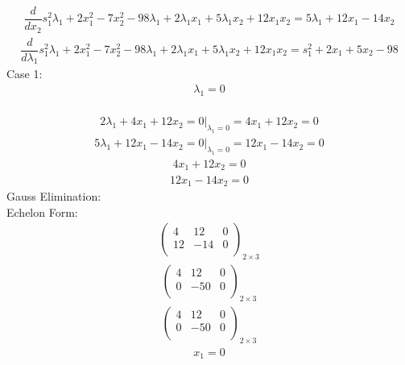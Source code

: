 \documentclass{article}
\begin{document}
\begin{align*}
\dfrac{d}{dx_{2}}s_{1}^{2}\lambda_{1} + 2x_{1}^{2} - 7x_{2}^{2} - 98\lambda_{1} + 2\lambda_{1}x_{1} + 5\lambda_{1}x_{2} + 12x_{1}x_{2}=5\lambda_{1} + 12x_{1} - 14x_{2}\end{align*}
\begin{align*}
\dfrac{d}{d\lambda_{1}}s_{1}^{2}\lambda_{1} + 2x_{1}^{2} - 7x_{2}^{2} - 98\lambda_{1} + 2\lambda_{1}x_{1} + 5\lambda_{1}x_{2} + 12x_{1}x_{2}=s_{1}^{2} + 2x_{1} + 5x_{2} - 98\end{align*}
Case 1: \begin{align*}
\lambda_{1}=0\end{align*}
 \\
\begin{align*}
\left.2\lambda_{1} + 4x_{1} + 12x_{2}=0\right|_{\lambda_{1}=0}=4x_{1} + 12x_{2}=0\end{align*}
\begin{align*}
\left.5\lambda_{1} + 12x_{1} - 14x_{2}=0\right|_{\lambda_{1}=0}=12x_{1} - 14x_{2}=0\end{align*}
\begin{align*}
4x_{1} + 12x_{2}=0\end{align*}
\begin{align*}
12x_{1} - 14x_{2}=0\end{align*}
Gauss Elimination:\\
Echelon Form:\\
\begin{align*}
\left(
\begin{array}{cc|c}
4 & 12 & 0\\
12 & -14 & 0\\
\end{array}
\right)_{2\times 3}
\end{align*}
\begin{align*}
\left(
\begin{array}{cc|c}
4 & 12 & 0\\
0 & -50 & 0\\
\end{array}
\right)_{2\times 3}
\end{align*}
\begin{align*}
\left(
\begin{array}{cc|c}
4 & 12 & 0\\
0 & -50 & 0\\
\end{array}
\right)_{2\times 3}
\end{align*}
\begin{align*}
x_{1}=0\end{align*}
\end{document}

